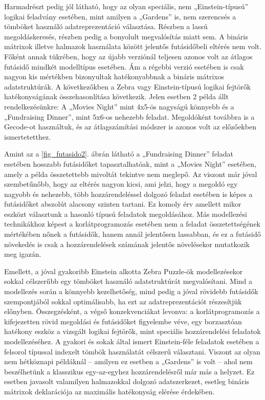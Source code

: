 \documentclass[12pt,a4paper,twoside, openright]{report}
\begin{document}
    Harmadrészt pedig jól látható, hogy az olyan speciális, nem „Einstein-típusú” logikai feladvány esetében, mint amilyen a „Gardens” is, nem szerencsés a tömböket használó adatreprezentáció választása.
    Részben a lassú megoldáskeresés, részben pedig a bonyolult megvalósítás miatt sem.
    A bináris mátrixok illetve halmazok használata között jelentős futásidőbeli eltérés nem volt.
    Főként annak tükrében, hogy az újabb verziónál teljesen azonos volt az átlagos futásidő mindkét modelltípus esetében.
    Ám a régebbi verzió esetében is csak nagyon kis mértékben bizonyultak hatékonyabbnak a bináris mátrixos adatstruktúrák.
    A következőkben a Zebra vagy Einstein-típusú logikai fejtörők hatékonyságának 
    összehasonlítása következik.
    Jelen esetben 2 példa állt rendelkezésünkre: A „Movies 
    Night” mint 4x5-ös nagyságú könnyebb és a „Fundraising Dinner”, mint 5x6-os nehezebb 
    feladat.
    Megoldóként továbbra is a Gecode-ot használtuk, és az átlagszámítási módszer 
    is azonos volt az előzőekben ismertetetthez.


    Amint az a \ref{fig_futasido2}. ábrán látható a „Fundraising Dinner” feladat esetében hosszabb futásidőket tapasztalhatóak, mint a „Movies Night” esetében, amely a példa összetettebb mivoltát tekintve nem meglepő.
    Az viszont már jóval szembetűnőbb, hogy az eltérés nagyon kicsi, ami jelzi, hogy a megoldó egy nagyobb és nehezebb, több hozzárendeléssel dolgozó feladat esetében is képes a futásidőket abszolút alacsony szinten tartani.
    Ez komoly érv amellett mikor eszközt választunk a hasonló típusú feladatok megoldásához.
    Más modellezési technikákhoz képest a korlátprogramozás esetében nem a feladat összetettségének mértékében nőnek a futásidők, hanem annál jelentősen lassabban, és ez a futásidő növekedés is csak a hozzárendelések számának jelentős növelésekor mutatkozik meg igazán.

    Emellett, a jóval gyakoribb Einstein alkotta Zebra Puzzle-ök modellezésekor sokkal célszerűbb egy tömböket használó adatstruktúrát megvalósítani.
    Mind a modellezés során a könnyebb kezelhetőség, mind pedig a jóval rövidebb futásidők szempontjából sokkal optimálisabb, ha ezt az adatreprezentációt részesítjük előnyben.
    Összegzésként, a végső konzekvenciákat levonva: a korlátprogramozás a kifejezetten rövid megoldási és futásidőket figyelembe véve, egy borzasztóan hatékony eszköz a vizsgált logikai fejtörők, mint speciális hozzárendelési feladatok modellezéséhez.
    A gyakori és sokak által ismert Einstein-féle feladatok esetében a felsorol típussal indexelt tömbök használatát célszerű választani.
    Viszont az olyan nem hétköznapi példáknál – amilyen ez esetben a „Gardens” is volt – ahol nem beszélhetünk a klasszikus egy-az-egyhez hozzárendelésről már más a helyzet.
    Ez esetben javasolt valamilyen halmazokkal dolgozó adatszerkezet, esetleg bináris mátrixok deklarációja az maximális hatékonyság elérése érdekében.
\end{document}
